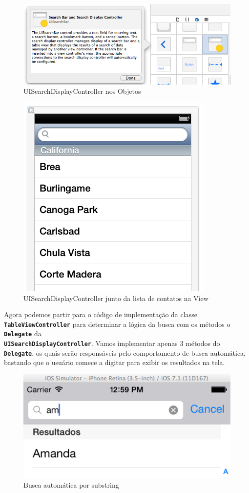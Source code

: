 \documentclass[a4paper,12pt,brazil,oneside]{book}
\begin{document}
\begin{figure}[H]
  \centering
  \includegraphics[width=.75\textwidth]{figuras/table/table2.png}
  \caption{UISearchDisplayController nos Objetos}
  \label{fig:a}
\end{figure}

\begin{figure}[H]
  \centering
  \includegraphics[width=.75\textwidth]{figuras/table/table1.png}
  \caption{UISearchDisplayController junto da lista de contatos na View}
  \label{fig:a}
\end{figure}

Agora podemos partir para o código de implementação da classe \texttt{\textbf{TableViewController}} para determinar a lógica da busca com os métodos o \texttt{\textbf{Delegate}} da\\
\texttt{\textbf{UISearchDisplayController}}. Vamos implementar apenas 3 métodos do \texttt{\textbf{Delegate}}, os quais serão responsáveis pelo comportamento de busca automática, bastando que o usuário comece a digitar para exibir os resultados na tela.

\begin{figure}[H]
  \centering
  \includegraphics[width=.75\textwidth]{figuras/table/table7.png}
  \caption{Busca automática por substring}
  \label{fig:a}
\end{figure}
\end{document}
